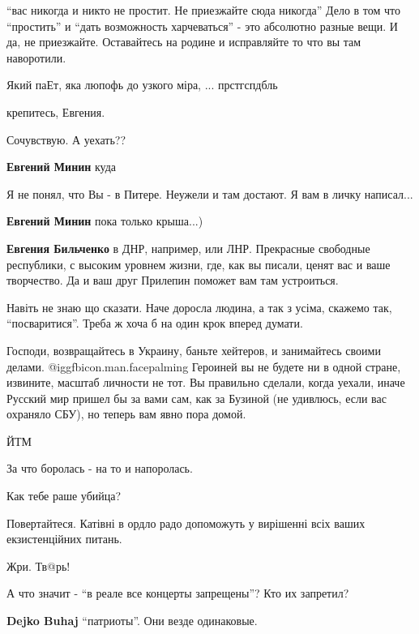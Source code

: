 \begin{itemize}
\enquote{вас никогда и никто не простит. Не приезжайте сюда никогда}
Дело в том что \enquote{простить} и \enquote{дать возможность харчеваться} - это абсолютно разные вещи.
И да, не приезжайте. Оставайтесь на родине и исправляйте то что вы там наворотили.

Який паЕт, яка люпофь до узкого міра, ... прстгспдбль

крепитесь, Евгения.

Сочувствую. А уехать??

\begin{itemize} %
\textbf{Евгений Минин} куда

Я не понял, что Вы - в Питере. Неужели и там достают. Я вам в личку написал...

\textbf{Евгений Минин} пока только крыша...)

\textbf{Евгения Бильченко} в ДНР, например, или ЛНР. Прекрасные свободные республики, с высоким уровнем жизни, где, как вы писали, ценят вас и ваше творчество. Да и ваш друг Прилепин поможет вам там устроиться.
\end{itemize} %

Навіть не знаю що сказати. Наче доросла людина, а так з усіма, скажемо так,
\enquote{посваритися}. Треба ж хоча б на один крок вперед думати.


Господи, возвращайтесь в Украину, баньте хейтеров, и занимайтесь своими делами. @igg{fbicon.man.facepalming} 
Героиней вы не будете ни в одной стране, извините, масштаб личности не тот. Вы правильно сделали, когда уехали, иначе Русский мир пришел бы за вами сам, как за Бузиной (не удивлюсь, если вас охраняло СБУ), но теперь вам явно пора домой.

ЙТМ

За что боролась - на то и напоролась.

Как тебе раше убийца?

Повертайтеся. Катівні в ордло радо допоможуть у вирішенні всіх ваших екзистенційних питань.

Жри. Тв@рь!

А что значит - \enquote{в реале все концерты запрещены}? Кто их запретил?

\begin{itemize} %
\textbf{Dejko Buhaj} \enquote{патриоты}. Они везде одинаковые.


\end{itemize}
\end{itemize}
